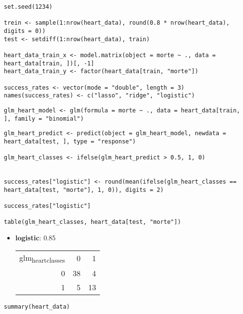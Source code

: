 \documentclass[11pt]{article}
\begin{document}
\begin{verbatim}
set.seed(1234)

trein <- sample(1:nrow(heart_data), round(0.8 * nrow(heart_data), digits = 0))
test <- setdiff(1:nrow(heart_data), train)

heart_data_train_x <- model.matrix(object = morte ~ ., data = heart_data[train, ])[, -1]
heart_data_train_y <- factor(heart_data[train, "morte"])

success_rates <- vector(mode = "double", length = 3)
names(success_rates) <- c("lasso", "ridge", "logistic")
\end{verbatim}

\begin{verbatim}
glm_heart_model <- glm(formula = morte ~ ., data = heart_data[train, ], family = "binomial")
\end{verbatim}

\begin{verbatim}
glm_heart_predict <- predict(object = glm_heart_model, newdata = heart_data[test, ], type = "response")

glm_heart_classes <- ifelse(glm_heart_predict > 0.5, 1, 0)


success_rates["logistic"] <- round(mean(ifelse(glm_heart_classes == heart_data[test, "morte"], 1, 0)), digits = 2)

success_rates["logistic"]

table(glm_heart_classes, heart_data[test, "morte"])
\end{verbatim}


\begin{itemize}
\item \textbf{logistic}: 0.85 
\begin{center}
\begin{tabular}{rrr}
\hline
glm\textsubscript{heart}\textsubscript{classes} & 0 & 1\\
0 & 38 & 4\\
1 & 5 & 13\\
\hline
\end{tabular}
\end{center}
\end{itemize}


\begin{verbatim}
summary(heart_data)
\end{verbatim}
\end{document}
